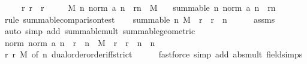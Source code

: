 \begin{isabellebody}
\ \ \ \ \ r{}{\isacharcolon}{\kern0pt}\ {\isachardoublequoteopen}r\ {\isacharless}{\kern0pt}\ r{}{\isachardoublequoteclose}\isanewline
\ \ \ \ \ M{\isacharcolon}{\kern0pt}\ {\isachardoublequoteopen}{\isasymAnd}n{\isachardot}{\kern0pt}\ norm\ {\isacharparenleft}{\kern0pt}a\ n{\isacharparenright}{\kern0pt}\ {\isacharasterisk}{\kern0pt}\ r{}{\isacharcircum}{\kern0pt}n\ {\isasymle}\ M{\isachardoublequoteclose}\isanewline
\ \ \ {\isachardoublequoteopen}summable\ {\isacharparenleft}{\kern0pt}{\isasymlambda}n{\isachardot}{\kern0pt}\ norm\ {\isacharparenleft}{\kern0pt}a\ n{\isacharparenright}{\kern0pt}\ {\isacharasterisk}{\kern0pt}\ r{\isacharcircum}{\kern0pt}n{\isacharparenright}{\kern0pt}{\isachardoublequoteclose}\isanewline
%
\isadelimproof
%
\endisadelimproof
%
\isatagproof
{}\isamarkupfalse%
\ {\isacharparenleft}{\kern0pt}rule\ summable{\isacharunderscore}{\kern0pt}comparison{\isacharunderscore}{\kern0pt}test{\isacharprime}{\kern0pt}{\isacharparenright}{\kern0pt}\isanewline
\ \ \isamarkupfalse%
\ {\isachardoublequoteopen}summable\ {\isacharparenleft}{\kern0pt}{\isasymlambda}n{\isachardot}{\kern0pt}\ M\ {\isacharasterisk}{\kern0pt}\ {\isacharparenleft}{\kern0pt}r\ {\isacharslash}{\kern0pt}\ r{}{\isacharparenright}{\kern0pt}\ {\isacharcircum}{\kern0pt}\ n{\isacharparenright}{\kern0pt}{\isachardoublequoteclose}\isanewline
\ \ \ \ \isamarkupfalse%
\ assms\ \isamarkupfalse%
\ {\isacharparenleft}{\kern0pt}auto\ simp\ add{\isacharcolon}{\kern0pt}\ summable{\isacharunderscore}{\kern0pt}mult\ summable{\isacharunderscore}{\kern0pt}geometric{\isacharparenright}{\kern0pt}\isanewline
\ \ \isamarkupfalse%
\ {\isachardoublequoteopen}norm\ {\isacharparenleft}{\kern0pt}norm\ {\isacharparenleft}{\kern0pt}a\ n{\isacharparenright}{\kern0pt}\ {\isacharasterisk}{\kern0pt}\ r\ {\isacharcircum}{\kern0pt}\ n{\isacharparenright}{\kern0pt}\ {\isasymle}\ M\ {\isacharasterisk}{\kern0pt}\ {\isacharparenleft}{\kern0pt}r\ {\isacharslash}{\kern0pt}\ r{}{\isacharparenright}{\kern0pt}\ {\isacharcircum}{\kern0pt}\ n{\isachardoublequoteclose}\ \ n\isanewline
\ \ \ \ \isamarkupfalse%
\ r\ r{}\ M\ {\isacharbrackleft}{\kern0pt}of\ n{\isacharbrackright}{\kern0pt}\ dual{\isacharunderscore}{\kern0pt}order{\isachardot}{\kern0pt}order{\isacharunderscore}{\kern0pt}iff{\isacharunderscore}{\kern0pt}strict\isanewline
\ \ \ \ \isamarkupfalse%
\ {\isacharparenleft}{\kern0pt}fastforce\ simp\ add{\isacharcolon}{\kern0pt}\ abs{\isacharunderscore}{\kern0pt}mult\ field{\isacharunderscore}{\kern0pt}simps{\isacharparenright}{\kern0pt}\isanewline

\end{isabellebody}
